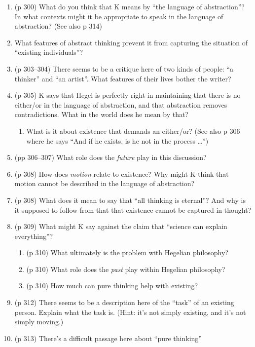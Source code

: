 \documentclass[fleqn,12pt]{article}
\begin{document}
\begin{enumerate}
\item (p 300) What do you think that K means by ``the language of
  abstraction''?  In what contexts might it be appropriate to speak in
  the language of abstraction?  (See also p 314)
\item What features of abstract thinking prevent it from capturing the
  situation of ``existing individuals''?
\item (p 303--304) There seems to be a critique here of two kinds of
  people: ``a thinker'' and ``an artist''.  What features of their
  lives bother the writer?
\item (p 305) K says that Hegel is perfectly right in maintaining that
  there is no either/or in the language of abstraction, and that
  abstraction removes contradictions.  What in the world does he mean
  by that?
  \begin{enumerate}
  \item What is it about existence that demands an either/or? (See
    also p 306 where he says ``And if he exists, is he not in the
    process \dots '')
  \end{enumerate}
\item (pp 306--307) What role does the \emph{future} play in this
  discussion?
\item (p 308) How does \emph{motion} relate to existence?  Why might K
  think that motion cannot be described in the language of
  abstraction?
\item (p 308) What does it mean to say that ``all thinking is
  eternal''?  And why is it supposed to follow from that that
  existence cannot be captured in thought?
\item (p 309) What might K say against the claim that ``science can
  explain everything''?
  \begin{enumerate}
  \item (p 310) What ultimately is the problem with Hegelian
    philosophy?
  \item (p 310) What role does the \emph{past} play within Hegelian
    philosophy?
  \item (p 310) How much can pure thinking help with existing?  
  \end{enumerate}
\item (p 312) There seems to be a description here of the ``task'' of
  an existing person.  Explain what the task is.  (Hint: it's not
  simply existing, and it's not simply moving.)
\item (p 313) There's a difficult passage here about ``pure thinking''

\end{enumerate}
\end{document}
